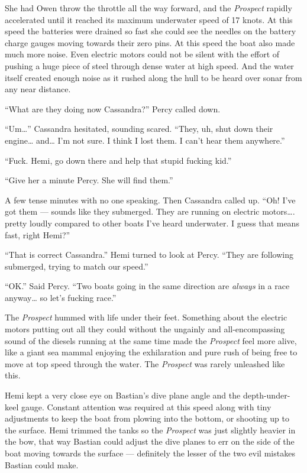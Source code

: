 \documentclass[]{scrbook}
\begin{document}
She had Owen throw the throttle all the way forward, and the
\emph{Prospect} rapidly accelerated until it reached its maximum
underwater speed of 17 knots. At this speed the batteries were drained
so fast she could see the needles on the battery charge gauges moving
towards their zero pins. At this speed the boat also made much more
noise. Even electric motors could not be silent with the effort of
pushing a huge piece of steel through dense water at high speed. And the
water itself created enough noise as it rushed along the hull to be
heard over sonar from any near distance.

``What are they doing now Cassandra?'' Percy called down.

``Um\ldots{}'' Cassandra hesitated, sounding scared. ``They, uh, shut
down their engine\ldots{} and\ldots{} I'm not sure. I think I lost them.
I can't hear them anywhere.''

``Fuck. Hemi, go down there and help that stupid fucking kid.''

``Give her a minute Percy. She will find them.''

A few tense minutes with no one speaking. Then Cassandra called up.
``Oh! I've got them --- sounds like they submerged. They are running on
electric motors\ldots{}. pretty loudly compared to other boats I've
heard underwater. I guess that means fast, right Hemi?''

``That is correct Cassandra.'' Hemi turned to look at Percy. ``They are
following submerged, trying to match our speed.''

``OK.'' Said Percy. ``Two boats going in the same direction are
\emph{always} in a race anyway\ldots{} so let's fucking race.''

The \emph{Prospect} hummed with life under their feet. Something about
the electric motors putting out all they could without the ungainly and
all-encompassing sound of the diesels running at the same time made the
\emph{Prospect} feel more alive, like a giant sea mammal enjoying the
exhilaration and pure rush of being free to move at top speed through
the water. The \emph{Prospect} was rarely unleashed like this.

Hemi kept a very close eye on Bastian's dive plane angle and the
depth-under-keel gauge. Constant attention was required at this speed
along with tiny adjustments to keep the boat from plowing into the
bottom, or shooting up to the surface. Hemi trimmed the tanks so the
\emph{Prospect} was just slightly heavier in the bow, that way Bastian
could adjust the dive planes to err on the side of the boat moving
towards the surface --- definitely the lesser of the two evil mistakes
Bastian could make.
\end{document}

